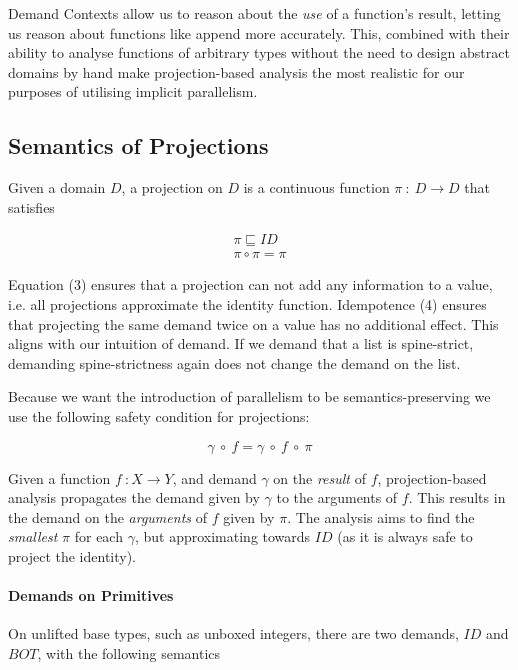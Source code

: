 Demand Contexts allow us to reason about the \emph{use} of a function's result,
letting us reason about functions like \<append\> more accurately. This, combined
with their ability to analyse functions of arbitrary types without the need to
design abstract domains by hand make projection-based analysis the most
realistic for our purposes of utilising implicit parallelism.

\pagebreak

\subsection{Semantics of Projections}

Given a domain $D$, a projection on $D$ is a continuous function
$\pi \ : \ D \rightarrow D$ that satisfies

\begin{align}
\pi \sqsubseteq ID \\
\pi \circ \pi = \pi
\end{align}

Equation (3) ensures that a projection can not add any information to a value,
i.e. all projections approximate the identity function. Idempotence (4) ensures
that projecting the same demand twice on a value has no additional effect. This
aligns with our intuition of demand. If we demand that a list is spine-strict,
demanding spine-strictness again does not change the demand on the list.

Because we want the introduction of parallelism to be semantics-preserving we
use the following safety condition for projections:

\begin{equation}
\gamma \ \circ \ f = \gamma \ \circ \ f \ \circ \ \pi
\end{equation}

Given a function $f \ : X \rightarrow Y$, and demand $\gamma$ on the
\emph{result} of $f$, projection-based analysis propagates the demand given by
$\gamma$ to the arguments of $f$. This results in the demand on the
\emph{arguments} of $f$ given by $\pi$.  The analysis aims to find the
\emph{smallest} $\pi$ for each $\gamma$, but approximating towards $ID$ (as
it is always safe to project the identity).

\paragraph{Demands on Primitives}
On unlifted base types, such as unboxed integers, there are two demands,
$ID$ and $BOT$, with the following semantics


